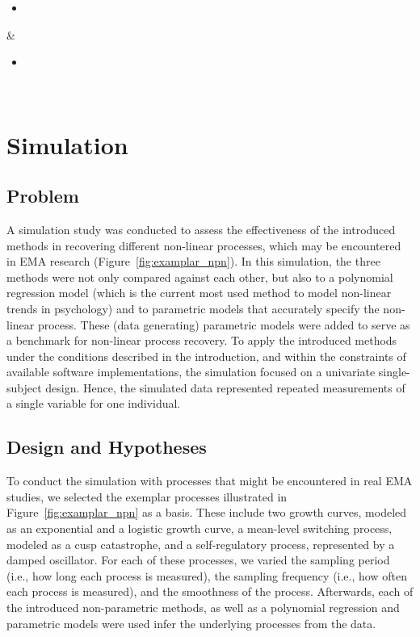 \documentclass[man, floatsintext]{apa7}
\begin{document}
\begin{table}[htbp]
\begin{center}
\begin{threeparttable}
\begin{tabularx}{\linewidth}
        \begin{itemize}
          \item \textcite{rasmussen_gaussian_2006}
        \end{itemize}                        &
        \begin{itemize}
          \item \textcite{wood_generalized_2006}
        \end{itemize}
        \\
        \bottomrule
      \end{tabularx}
    \end{threeparttable}
  \end{center}
\end{table}

\section{Simulation} \label{simulation}

\subsection{Problem}

A simulation study was conducted to assess the effectiveness of the introduced
methods in recovering different non-linear processes, which may be encountered
in EMA research (Figure~\ref{fig:examplar_npn}). In this simulation, the three
methods were not only compared against each other, but also to a polynomial
regression model (which is the current most used method to model non-linear
trends in psychology) and to parametric models that accurately specify the
non-linear process. These (data generating) parametric models were added to
serve as a benchmark for non-linear process recovery. To apply the introduced
methods under the conditions described in the introduction, and within the
constraints of available software implementations, the simulation focused on a
univariate single-subject design. Hence, the simulated data represented
repeated measurements of a single variable for one individual.

\subsection{Design and Hypotheses}

To conduct the simulation with processes that might be encountered in real EMA
studies, we selected the exemplar processes illustrated in
Figure~\ref{fig:examplar_npn} as a basis. These include two growth curves,
modeled as an exponential and a logistic growth curve, a mean-level switching
process, modeled as a cusp catastrophe, and a self-regulatory process,
represented by a damped oscillator. For each of these processes,
we varied the sampling period (i.e., how long each process is measured),
the sampling frequency (i.e., how often each process is measured), and the
smoothness of the process. Afterwards, each of the introduced non-parametric
methods, as well as a polynomial regression and parametric models were used
infer the underlying processes from the data.
\end{document}
